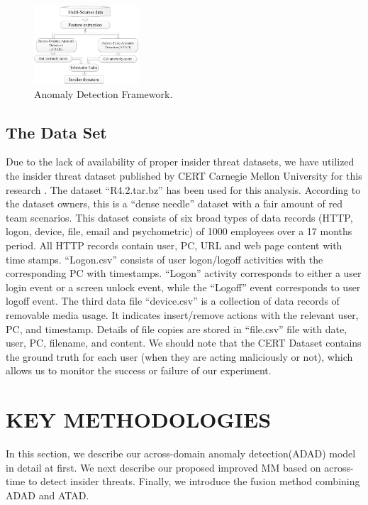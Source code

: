 \documentclass[conference]{IEEEtran}
\begin{document}
\begin{figure}[htb]
\centerline{\includegraphics[width = 0.35\textwidth]{figure/figure2.eps}}
\caption{Anomaly Detection Framework.}
\label{fig}
\end{figure}

\subsection{The Data Set}

Due to the lack of availability of proper insider threat datasets, we have utilized the insider threat
dataset published by CERT Carnegie Mellon University for this research \cite{b39}. The dataset “R4.2.tar.bz” has been used for this analysis. According to the dataset owners, this is a “dense needle” dataset with a fair amount of red team scenarios. This dataset consists of six broad types of data records (HTTP, logon, device, file, email and psychometric) of 1000 employees over a 17 months period. 
All HTTP records contain user, PC, URL and web page content with time stamps. “Logon.csv” consists of user logon/logoff activities with the corresponding PC with timestamps. “Logon” activity corresponds to either a user login event or a screen unlock event, while the “Logoff” event corresponds to user logoff event.  The third data file “device.csv” is a collection of data records of removable media usage. It indicates insert/remove actions with the relevant user, PC, and timestamp. Details of file copies are stored in “file.csv” file with date, user, PC, filename, and content.
We should note that the CERT Dataset contains the ground truth for each user (when they are acting maliciously or not), which allows us to monitor the success or failure of our experiment.

\section{KEY METHODOLOGIES}
In this section, we describe our across-domain anomaly detection(ADAD) model in detail at first. We next describe our proposed improved MM based on across-time to detect insider threats. Finally, we introduce the fusion method combining ADAD and ATAD.
\end{document}
